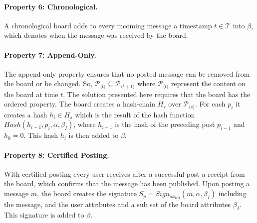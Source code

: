 \documentclass[bibtotoc,halfparskip,oneside]{scrreprt}
\begin{document}
\paragraph*{Property 6: Chronological.}

A chronological board adds to every incoming message a timestamp $t\in\mathcal{T}$ into $\beta$, which denotes when the message was received by the board.

\paragraph*{Property 7: Append-Only.}

The append-only property ensures that no posted message can be removed from the board or be changed. So, $\mathcal{P}_{\langle t\rangle} \subseteq \mathcal{P}_{{\langle t+1\rangle}}$ where $\mathcal{P}_{{\langle t\rangle}} $ represent the content on the board at time $t$. The solution presented here requires that the board has the ordered property. The board creates a hash-chain $H_s$ over $\mathcal{P}_{\langle s\rangle}$. For each $p_i$ it creates a hash $h_i\in{H_s}$ which is the result of the hash function $\mathit{Hash}(h_{i-1}, p_i, \alpha, \beta_{I})$, where $h_{i-1}$ is the hash of the preceding post $p_{i-1}$ and $h_0=0$.
This hash $h_i$ is then added to $\beta$.

\paragraph*{Property 8: Certified Posting.}

With certified posting every user receives after a successful post a receipt from the board, which confirms that the message has been published.
Upon posting a message $m$, the board creates the signature $S_p= Sign_{sk_{BB}}(m, \alpha,\beta_I)$ including the message, and the user attributes and a sub set of the board attributes $\beta_I$. This signature is added to $\beta$.
\end{document}
